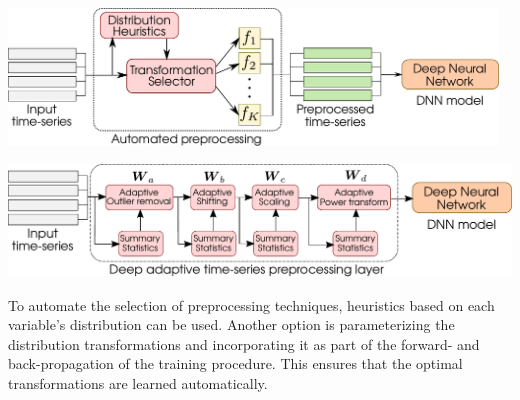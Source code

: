 \documentclass[portrait,final,x11names,a1paper,fontscale=0.4]{baposter}
\begin{document}
\begin{poster}
{\noindent
\begin{minipage}{.975\textwidth}
    \vspace*{-.3cm}
    \includegraphics[width=0.975\textwidth]{Figures/automated-preprocessing-heuristics.pdf} 
\end{minipage}
\begin{minipage}{.975\textwidth}
    \vspace*{-.15cm}
    \includegraphics[width=\textwidth]{Figures/automated-preprocessing-adaptive.pdf} 
    \vspace*{-.15cm}
\end{minipage}

\noindent
To automate the selection of preprocessing techniques, heuristics based on each
variable's distribution can be used. Another option is parameterizing the distribution
transformations and incorporating it as part of the forward- and back-propagation of the
training procedure. This ensures that the optimal transformations are learned automatically.
}


\end{poster}
\end{document}
